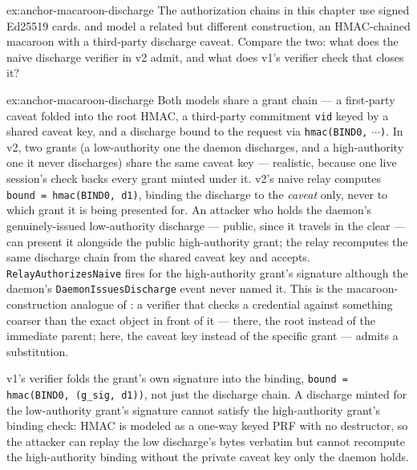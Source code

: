 \documentclass[11pt,a4paper]{article}
\theoremstyle{definition}
\begin{document}
%
\begin{pdexercise}[kind=Trace,rating=3]{ex:anchor-macaroon-discharge}
The authorization chains in this chapter use signed Ed25519 cards.  and  model a related but different construction, an HMAC-chained macaroon with a third-party discharge caveat. Compare the two: what does the naive discharge verifier in v2 admit, and what does v1's verifier check that closes it?
\end{pdexercise}
\begin{pdsolution}{ex:anchor-macaroon-discharge}
Both models share a grant chain --- a first-party caveat folded into the root HMAC, a third-party commitment \texttt{vid} keyed by a shared caveat key, and a discharge bound to the request via \texttt{hmac(BIND0,} $\cdots$\texttt{)}. In v2, two grants (a low-authority one the daemon discharges, and a high-authority one it never discharges) share the same caveat key --- realistic, because one live session's check backs every grant minted under it. v2's naive relay computes \texttt{bound = hmac(BIND0, d1)}, binding the discharge to the \emph{caveat} only, never to which grant it is being presented for. An attacker who holds the daemon's genuinely-issued low-authority discharge --- public, since it travels in the clear --- can present it alongside the public high-authority grant; the relay recomputes the same discharge chain from the shared caveat key and accepts. \texttt{RelayAuthorizesNaive} fires for the high-authority grant's signature although the daemon's \texttt{DaemonIssuesDischarge} event never named it. This is the macaroon-construction analogue of : a verifier that checks a credential against something coarser than the exact object in front of it --- there, the root instead of the immediate parent; here, the caveat key instead of the specific grant --- admits a substitution.

v1's verifier folds the grant's own signature into the binding, \texttt{bound = hmac(BIND0, (g\_sig, d1))}, not just the discharge chain. A discharge minted for the low-authority grant's signature cannot satisfy the high-authority grant's binding check: HMAC is modeled as a one-way keyed PRF with no destructor, so the attacker can replay the low discharge's bytes verbatim but cannot recompute the high-authority binding without the private caveat key only the daemon holds.


\end{pdsolution}
\end{document}
